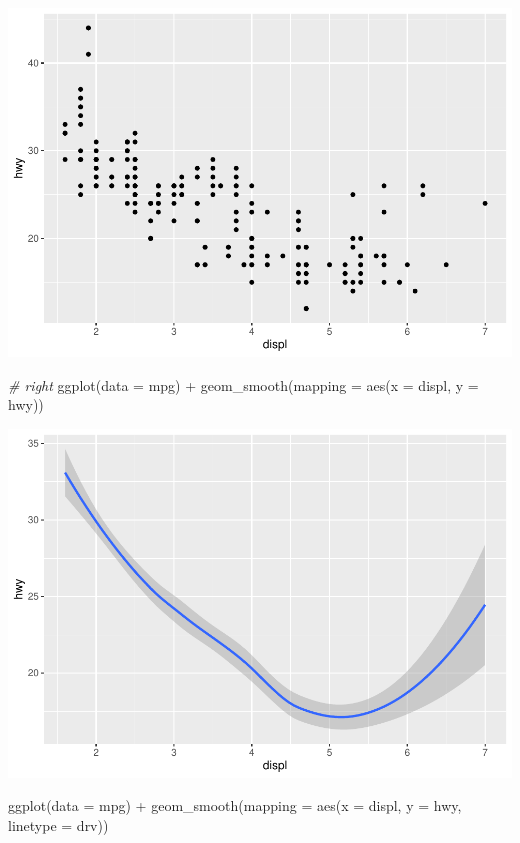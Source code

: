 \documentclass[
]{article}
\newenvironment{Shaded}{\begin{snugshade}}{\end{snugshade}}
\newcommand{\AttributeTok}[1]{\textcolor[rgb]{0.77,0.63,0.00}{#1}}
\newcommand{\CommentTok}[1]{\textcolor[rgb]{0.56,0.35,0.01}{\textit{#1}}}
\newcommand{\FunctionTok}[1]{\textcolor[rgb]{0.00,0.00,0.00}{#1}}
\newcommand{\NormalTok}[1]{#1}
\newcommand{\SpecialCharTok}[1]{\textcolor[rgb]{0.00,0.00,0.00}{#1}}
\begin{document}
\includegraphics{Journal_files/figure-latex/unnamed-chunk-41-1.pdf}

\begin{Shaded}
\begin{Highlighting}[]
\CommentTok{\# right}
\FunctionTok{ggplot}\NormalTok{(}\AttributeTok{data =}\NormalTok{ mpg) }\SpecialCharTok{+} 
  \FunctionTok{geom\_smooth}\NormalTok{(}\AttributeTok{mapping =} \FunctionTok{aes}\NormalTok{(}\AttributeTok{x =}\NormalTok{ displ, }\AttributeTok{y =}\NormalTok{ hwy))}
\end{Highlighting}
\end{Shaded}

\includegraphics{Journal_files/figure-latex/unnamed-chunk-41-2.pdf}

\begin{Shaded}
\begin{Highlighting}[]
\FunctionTok{ggplot}\NormalTok{(}\AttributeTok{data =}\NormalTok{ mpg) }\SpecialCharTok{+} 
  \FunctionTok{geom\_smooth}\NormalTok{(}\AttributeTok{mapping =} \FunctionTok{aes}\NormalTok{(}\AttributeTok{x =}\NormalTok{ displ, }\AttributeTok{y =}\NormalTok{ hwy, }\AttributeTok{linetype =}\NormalTok{ drv))}
\end{Highlighting}
\end{Shaded}
\end{document}
